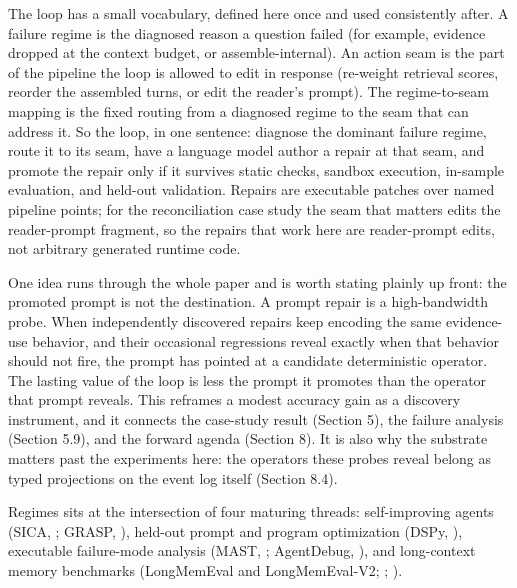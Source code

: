 The loop has a small vocabulary, defined here once and used consistently after. A failure regime is the diagnosed reason a question failed (for example, evidence dropped at the context budget, or assemble-internal). An action seam is the part of the pipeline the loop is allowed to edit in response (re-weight retrieval scores, reorder the assembled turns, or edit the reader's prompt). The regime-to-seam mapping is the fixed routing from a diagnosed regime to the seam that can address it. So the loop, in one sentence: diagnose the dominant failure regime, route it to its seam, have a language model author a repair at that seam, and promote the repair only if it survives static checks, sandbox execution, in-sample evaluation, and held-out validation. Repairs are executable patches over named pipeline points; for the reconciliation case study the seam that matters edits the reader-prompt fragment, so the repairs that work here are reader-prompt edits, not arbitrary generated runtime code.

One idea runs through the whole paper and is worth stating plainly up front: the promoted prompt is not the destination. A prompt repair is a high-bandwidth probe. When independently discovered repairs keep encoding the same evidence-use behavior, and their occasional regressions reveal exactly when that behavior should not fire, the prompt has pointed at a candidate deterministic operator. The lasting value of the loop is less the prompt it promotes than the operator that prompt reveals. This reframes a modest accuracy gain as a discovery instrument, and it connects the case-study result (Section 5), the failure analysis (Section 5.9), and the forward agenda (Section 8). It is also why the substrate matters past the experiments here: the operators these probes reveal belong as typed projections on the event log itself (Section 8.4).

Regimes sits at the intersection of four maturing threads: self-improving agents (SICA, \citet{robeyns2025sica}; GRASP, \citet{moll2026grasp}), held-out prompt and program optimization (DSPy, \citet{khattab2023dspy}), executable failure-mode analysis (MAST, \citet{cemri2025mast}; AgentDebug, \citet{zhu2025agentdebug}), and long-context memory benchmarks (LongMemEval and LongMemEval-V2; \citealp{wu2024longmemeval}; \citealp{wu2026longmemeval2}).

